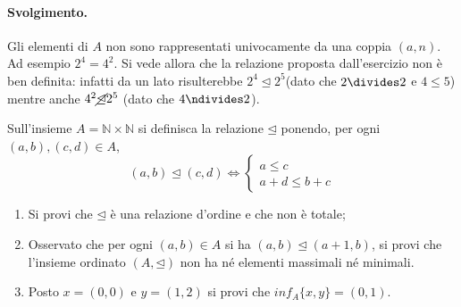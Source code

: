 \paragraph{Svolgimento.} Gli elementi di $A$ non sono rappresentati univocamente da una coppia $(a,n)$. Ad esempio $2^{4}=4^{2}$. Si vede allora che la relazione proposta dall'esercizio non è ben definita: infatti da un lato risulterebbe $2^{4} \unlhd 2^{5}$(dato che $2 \divides 2$ e $4 \leq 5$) mentre anche $4^{2} \cancel{\unlhd} 2^{5}$ (dato che $4 \ndivides 2$). \hfill \blacksquare
\begin{exsbox}
	Sull'insieme $A=\mathbb{N} \times \mathbb{N}$ si definisca la relazione $\unlhd$ ponendo, per ogni $(a,b),(c,d) \in A$,
	\begin{displaymath}
		(a,b) \unlhd (c,d) \iff \begin{cases}
			a \leq c \\
			a+d \leq b+c
		\end{cases}
	\end{displaymath}
	\begin{enumerate}
		\item Si provi che $\unlhd$ è una relazione d'ordine e che non è totale;
		\item Osservato che per ogni $(a,b) \in A$ si ha $(a,b) \unlhd (a+1,b)$, si provi che l'insieme ordinato $(A,\unlhd)$ non ha né elementi massimali né minimali.
		\item Posto $x=(0,0)$ e $y=(1,2)$ si provi che $inf_{A}\{x,y\}=(0,1)$.
	\end{enumerate}
\end{exsbox}

